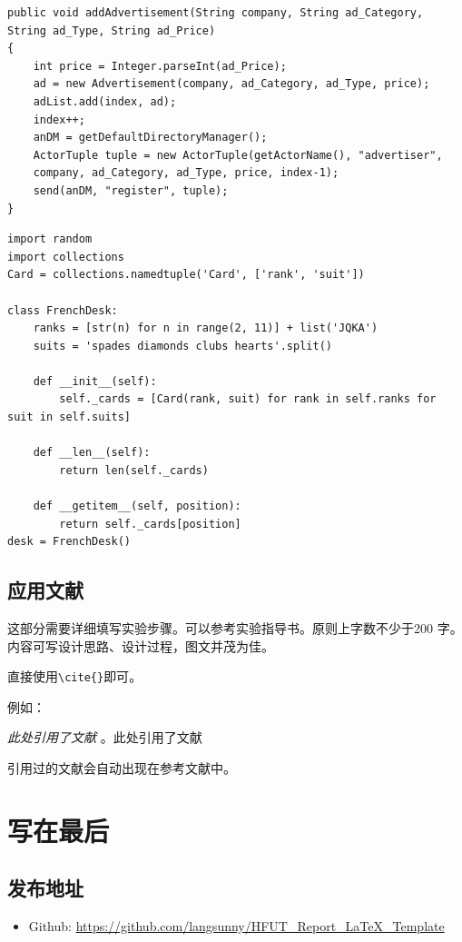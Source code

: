 \documentclass[12pt,hyperref,a4paper,UTF8]{ctexart}
\begin{document}
\begin{lstlisting}[style=Java, title="Java代码"]
public void addAdvertisement(String company, String ad_Category, String ad_Type, String ad_Price)
{
    int price = Integer.parseInt(ad_Price);
    ad = new Advertisement(company, ad_Category, ad_Type, price);
    adList.add(index, ad);
    index++;
    anDM = getDefaultDirectoryManager();
    ActorTuple tuple = new ActorTuple(getActorName(), "advertiser",
    company, ad_Category, ad_Type, price, index-1);
    send(anDM, "register", tuple);
}
\end{lstlisting}

\begin{lstlisting}[style=Python, title="Python代码"]                
import random
import collections
Card = collections.namedtuple('Card', ['rank', 'suit'])

class FrenchDesk:
    ranks = [str(n) for n in range(2, 11)] + list('JQKA')
    suits = 'spades diamonds clubs hearts'.split()
    
    def __init__(self):
        self._cards = [Card(rank, suit) for rank in self.ranks for suit in self.suits]
        
    def __len__(self):
        return len(self._cards)
        
    def __getitem__(self, position):
        return self._cards[position]
desk = FrenchDesk()
\end{lstlisting}

\subsection{应用文献}

这部分需要详细填写实验步骤。可以参考实验指导书。原则上字数不少于200
字。内容可写设计思路、设计过程，图文并茂为佳。





直接使用\verb|\cite{}|即可\cite{DBLP:conf/nips/VaswaniSPUJGKP17}。

例如：


   \textit{ 此处引用了文献}
   \cite{DBLP:conf/nips/VaswaniSPUJGKP17}。此处引用了文献\cite{DBLP:conf/nips/VaswaniSPUJGKP17}


引用过的文献会自动出现在参考文献中。

\section{写在最后}


\subsection{发布地址}
\begin{itemize}
    \item Github: \url{https://github.com/langsunny/HFUT_Report_LaTeX_Template}
\end{itemize}



\end{document}
